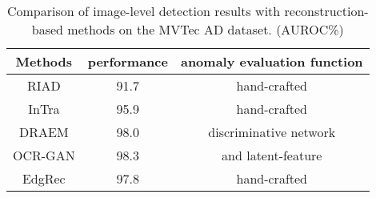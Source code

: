 \documentclass[5p, twocolumn]{elsarticle}[draft]
\begin{document}
\begin{table}[]
\footnotesize
\centering
\caption{Comparison of image-level detection results with reconstruction-based methods on the MVTec AD dataset. (AUROC\%)}
\label{Table4}
\begin{tabular}{c|cc}
\hline
Methods & performance & anomaly evaluation function \\ \hline
RIAD \cite{zavrtanik2021reconstruction}    & 91.7        & hand-crafted             \\
InTra \cite{pirnay2022inpainting}   & 95.9        & hand-crafted             \\
DRAEM \cite{zavrtanik2021draem}   & 98.0        & discriminative network   \\
OCR-GAN \cite{liang2022omni} & 98.3        &  and latent-feature    \\
EdgRec  & 97.8        & hand-crafted             \\ \hline
\end{tabular}
\end{table}
\end{document}
